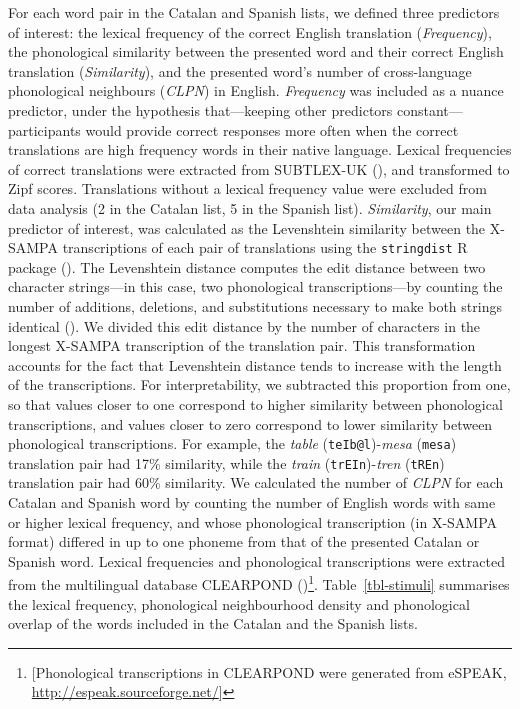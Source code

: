 \documentclass[
]{article}
\begin{document}
For each word pair in the Catalan and Spanish lists, we defined three
predictors of interest: the lexical frequency of the correct English
translation (\emph{Frequency}), the phonological similarity between the
presented word and their correct English translation
(\emph{Similarity}), and the presented word's number of cross-language
phonological neighbours (\emph{CLPN}) in English. \emph{Frequency} was
included as a nuance predictor, under the hypothesis that---keeping
other predictors constant---participants would provide correct responses
more often when the correct translations are high frequency words in
their native language. Lexical frequencies of correct translations were
extracted from SUBTLEX-UK (), and transformed to Zipf scores. Translations without a
lexical frequency value were excluded from data analysis (2 in the
Catalan list, 5 in the Spanish list). \emph{Similarity}, our main
predictor of interest, was calculated as the Levenshtein similarity
between the X-SAMPA transcriptions of each pair of translations using
the \texttt{stringdist} R package (). The Levenshtein distance computes the edit distance
between two character strings---in this case, two phonological
transcriptions---by counting the number of additions, deletions, and
substitutions necessary to make both strings identical
(). We divided
this edit distance by the number of characters in the longest X-SAMPA
transcription of the translation pair. This transformation accounts for
the fact that Levenshtein distance tends to increase with the length of
the transcriptions. For interpretability, we subtracted this proportion
from one, so that values closer to one correspond to higher similarity
between phonological transcriptions, and values closer to zero
correspond to lower similarity between phonological transcriptions. For
example, the \emph{table} (\texttt{teIb@l})-\emph{mesa} (\texttt{mesa})
translation pair had 17\% similarity, while the \emph{train}
(\texttt{trEIn})-\emph{tren} (\texttt{tREn}) translation pair had 60\%
similarity. We calculated the number of \emph{CLPN} for each Catalan and
Spanish word by counting the number of English words with same or higher
lexical frequency, and whose phonological transcription (in X-SAMPA
format) differed in up to one phoneme from that of the presented Catalan
or Spanish word. Lexical frequencies and phonological transcriptions
were extracted from the multilingual database CLEARPOND
()\footnote{{[}Phonological
  transcriptions in CLEARPOND were generated from eSPEAK,
  \url{http://espeak.sourceforge.net/}{]}}. Table~\ref{tbl-stimuli}
summarises the lexical frequency, phonological neighbourhood density and
phonological overlap of the words included in the Catalan and the
Spanish lists.
\end{document}
